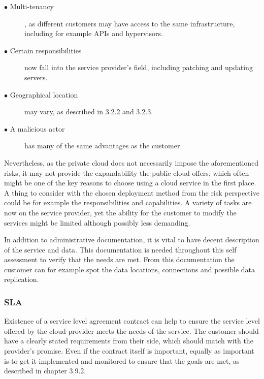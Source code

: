 \documentclass{article}
\begin{document}
\begin{description}
	\item[$\bullet$ Multi-tenancy], as different customers may have access to the same infrastructure, including for example APIs and hypervisors.
	\item[$\bullet$ Certain responsibilities] now fall into the service provider's field, including patching and updating servers.
	\item[$\bullet$ Geographical location] may vary, as described in 3.2.2 and 3.2.3.
	\item[$\bullet$ A malicious actor] has many of the same advantages as the customer.
\end{description}

Nevertheless, as the private cloud does not necessarily impose the aforementioned risks, it may not provide the expandability the public cloud offers, which often might be one of the key reasons to choose using a cloud service in the first place.
A thing to consider with the chosen deployment method from the risk perspective could be for example the responsibilities and capabilities. A variety of tasks are now on the service provider, yet the ability for the customer to modify the services might be limited although possibly less demanding.
\par
In addition to administrative documentation, it is vital to have decent description of the service and data. This documentation is needed throughout this self assessment to verify that the needs are met. From this documentation the customer can for example spot the data locations, connections and possible data replication.

\subsubsection{SLA}
Existence of a service level agreement contract can help to ensure the service level offered by the cloud provider meets the needs of the service. The customer should have a clearly stated requirements from their side, which should match with the provider's promise. Even if the contract itself is important, equally as important is to get it implemented and monitored to ensure that the goals are met, as described in chapter 3.9.2.
\end{document}
